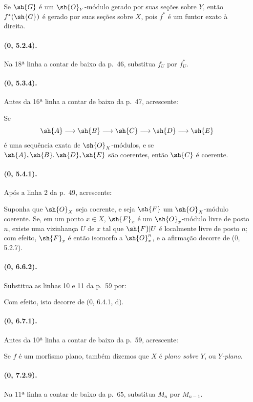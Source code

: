 \documentclass[oneside,10pt]{amsart}
\makeatletter
\newcommand{\ega@arrow}[2]{\mathchoice{#1}{#2}{#2}{#2}}
\renewcommand{\to}{\ega@arrow{\longrightarrow}{\rightarrow}}
\makeatother
\begin{document}
Se $\sh{G}$ é um $\sh{O}_Y$-módulo gerado por suas seções sobre $Y$,
então $f^*(\sh{G})$ é gerado por suas seções sobre $X$, pois $f^*$ é
um funtor exato à direita.

\paragraph{(0, 5.2.4).}
Na 18ª linha a contar de baixo da p.~46, substitua $f_U$ por $f_U^*$.

\paragraph{(0, 5.3.4).}
Antes da 16ª linha a contar de baixo da p.~47, acrescente:

Se
\[
  \sh{A}\to\sh{B}\to\sh{C}\to\sh{D}\to\sh{E}
\]
é uma sequência exata de $\sh{O}_X$-módulos, e se
$\sh{A},\sh{B},\sh{D},\sh{E}$ são coerentes, então $\sh{C}$ é
coerente.

\paragraph{(0, 5.4.1).}
Após a linha 2 da p.~49, acrescente:

Suponha que $\sh{O}_X$ seja coerente, e seja $\sh{F}$ um
$\sh{O}_X$-módulo coerente. Se, em um ponto $x\in X$, $\sh{F}_x$ é um
$\sh{O}_x$-módulo livre de posto $n$, existe uma vizinhança $U$ de $x$
tal que $\sh{F}|U$ é localmente livre de posto $n$; com efeito,
$\sh{F}_x$ é então isomorfo a $\sh{O}_x^n$, e a afirmação decorre de
(0, 5.2.7).

\paragraph{(0, 6.6.2).}
Substitua as linhas 10 e 11 da p.~59 por:

Com efeito, isto decorre de (0, 6.4.1, d).

\paragraph{(0, 6.7.1).}
Antes da 10ª linha a contar de baixo da p.~59, acrescente:

Se $f$ é um morfismo plano, também dizemos que $X$ é
\emph{plano sobre $Y$}, ou \emph{$Y$-plano}.

\paragraph{(0, 7.2.9).}
Na 11ª linha a contar de baixo da p.~65, substitua $M_n$ por
$M_{n-1}$.
\end{document}
